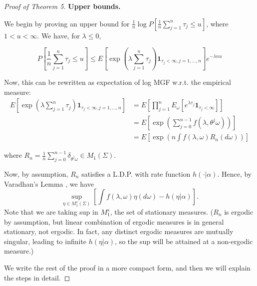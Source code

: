 \begin{proof}[Proof of Theorem 5]
	\textbf{Upper bounds.}

	We begin by proving an upper bound for $\frac{1}{n} \log P\left[\frac{1}{n} \sum_{j=1}^n \tau_j \leq u\right]$, where $1<u<\infty$. We have, for $\lambda \leq 0$,

\[
P\left[\frac{1}{n} \sum_{j=1}^n \tau_j \leq u\right] \leq E\left[\exp \left(\lambda \sum_{j=1}^n \tau_j\right) \mathbf{1}_{\tau_j<\infty, j=1, \ldots, n}\right] e^{-\lambda n u}
\]


Now, this can be rewritten as expectation of log MGF w.r.t. the empirical measure:
\[
\begin{aligned}
E\left[\exp \left(\lambda \sum_{j=1}^n \tau_j\right) \mathbf{1}_{\tau_j<\infty, j=1, \ldots, n}\right] & =E\left[\prod_{j=1}^n E_\omega\left[e^{\lambda \tau_j} \mathbf{1}_{\tau_j<\infty}\right]\right] \\
& =E\left[\exp \left(\sum_{j=0}^{n-1} f\left(\lambda, \theta^j \omega\right)\right)\right] \\
& =E\left[\exp \left(n \int f(\lambda, \omega) R_n(d \omega)\right)\right]
\end{aligned}
\]

where $R_n=\frac{1}{n} \sum_{j=0}^{n-1} \delta_{\theta^j \omega} \in M_1(\Sigma)$. 

Now, by assumption, $R_n$ satisfies a L.D.P. with rate function $h(\cdot | \alpha)$. Hence, by Varadhan's Lemma , we have
\[
	\sup_{\eta \in M_1^s(\Sigma)} \left[ \int f(\lambda, \omega) \eta(d \omega) - h(\eta | \alpha) \right] 
.\] 
Note that we are taking sup in $M_1^s$, the set of stationary measures. ($R_n$ is ergodic by assumption, but linear combination of ergodic measures is in general stationary, not ergodic. In fact, any distinct ergodic measures are mutually singular, leading to infinite $h(\eta | \alpha)$, so the sup will be attained at a non-ergodic measure.)

We write the rest of the proof in a more compact form, and then we will explain the steps in detail.


\end{proof}
